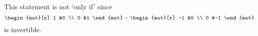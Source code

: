 \begin{exercises}
\begin{answer}
      This statement is not `only if' since
      \begin{equation*}
         \begin{mat}[r]
            1  &0  \\
            0  &1
         \end{mat}
         -\begin{mat}[r]
            -1  &0  \\
            0  &-1
         \end{mat}
      \end{equation*}
      is invertible.  
     \end{answer}
\end{exercises}
